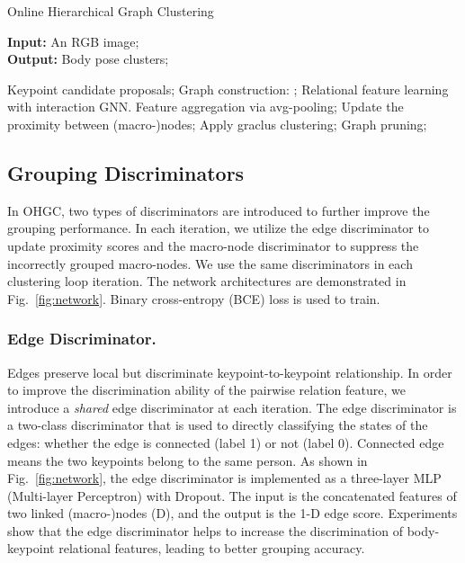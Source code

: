 \documentclass[runningheads]{llncs}
\begin{document}
	\begin{algorithm}
		\caption{Online Hierarchical Graph Clustering}
		\hspace*{0.02in} {\bf Input:}
		An RGB image; \\
		\hspace*{0.02in} {\bf Output:} 
		Body pose clusters;
		\begin{algorithmic}
			\State Keypoint candidate proposals;
			\State Graph construction: ;
			\State Relational feature learning with interaction GNN.
			\Repeat 
			\State Feature aggregation via avg-pooling;
			\State Update the proximity between (macro-)nodes;
			\State Apply graclus clustering; 
			\State Graph pruning;
		\end{algorithmic}
		\label{alg:OHGC}
	\end{algorithm}
	
	\subsection{Grouping Discriminators}
	\label{sec:discriminators}
	In OHGC, two types of discriminators are introduced to further improve the grouping performance. In each iteration, we utilize the edge discriminator to update proximity scores and the macro-node discriminator to suppress the incorrectly grouped macro-nodes. We use the same discriminators in each clustering loop iteration. The network architectures are demonstrated in Fig.~\ref{fig:network}. Binary cross-entropy (BCE) loss is used to train.
	
	\subsubsection{Edge Discriminator.} 
	Edges preserve local but discriminate keypoint-to-keypoint relationship. In order to improve the discrimination ability of the pairwise relation feature, we introduce a \emph{shared} edge discriminator at each iteration. The edge discriminator is a two-class discriminator that is used to directly classifying the states of the edges: whether the edge is connected (label 1) or not (label 0). Connected edge means the two keypoints belong to the same person. As shown in Fig.~\ref{fig:network}, the edge discriminator is implemented as a three-layer MLP (Multi-layer Perceptron) with Dropout. The input is the concatenated features of two linked (macro-)nodes (D), and the output is the 1-D edge score. Experiments show that the edge discriminator helps to increase the discrimination of body-keypoint relational features, leading to better grouping accuracy. 
	
\end{document}
